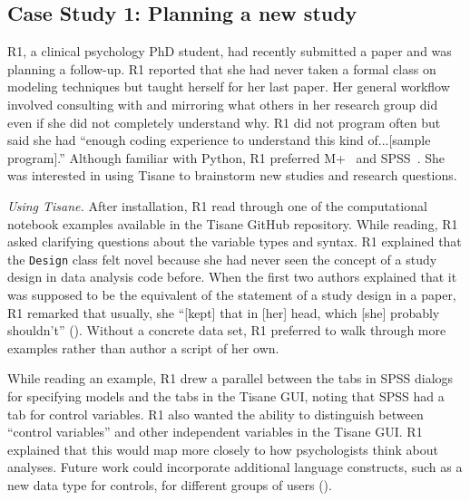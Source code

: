 \subsection{Case Study 1: Planning a new study}
R1, a clinical psychology PhD student, had recently submitted a paper and was
planning a follow-up.
R1 reported that she had never taken a formal class on modeling techniques but
taught herself for her last paper. Her general workflow involved consulting with
and mirroring what others in her research group did even if she did not
completely understand why. R1 did not program often but said she had ``enough
coding experience to understand this kind of...[sample program].'' Although
familiar with Python, R1 preferred M+~\cite{mplus} and SPSS~\cite{spss}. She was
interested in using Tisane to brainstorm new studies and research questions.

\textit{Using Tisane.} After installation, R1 read through one of the
computational notebook examples available in the Tisane GitHub repository.
While reading, R1 asked clarifying questions about the variable types and
syntax. R1 explained that the \texttt{Design} class felt novel because she had
never seen the concept of a study design in data analysis code before. When the
first two authors explained that it was supposed to be the equivalent of the
statement of a study design in a paper, R1 remarked that usually, she ``[kept]
that in [her] head, which [she] probably shouldn't'' (\rqCognitive). Without
a concrete data set, R1 preferred to walk through more examples %
rather than author a script of her own.

While reading an example, R1 drew a parallel between the tabs in SPSS dialogs for specifying models and
the tabs in the Tisane GUI, noting that SPSS had a tab for control variables.
R1 also wanted the ability to distinguish between ``control
variables'' and other independent variables in the Tisane GUI. R1 explained that this
would map more closely to how psychologists think about analyses.
Future work could incorporate additional language constructs, such as
a new data type for controls, for different groups of users (\rqFuture).

